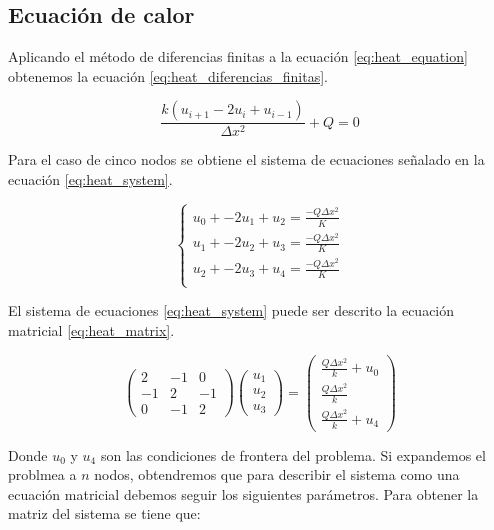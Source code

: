 \subsection{Ecuación de calor}

Aplicando el método de diferencias finitas a la ecuación \ref{eq:heat_equation} obtenemos la ecuación \ref{eq:heat_diferencias_finitas}.

\begin{equation}
    \frac{k(u_{i+1}-2u_i+u_{i-1})}{\Delta x^2} + Q = 0 \label{eq:heat_diferencias_finitas}
\end{equation}

Para el caso de cinco nodos se obtiene el sistema de ecuaciones señalado en la ecuación \ref{eq:heat_system}.

\begin{equation}
    \begin{cases}
        u_0 + -2u_1 +u_2 = \frac{-Q\Delta x^2}{K} \\
        u_1 + -2u_2 +u_3 = \frac{-Q\Delta x^2}{K} \\
        u_2 + -2u_3 +u_4 = \frac{-Q\Delta x^2}{K} \\
    \end{cases} \label{eq:heat_system}
\end{equation}

El sistema de ecuaciones \ref{eq:heat_system} puede ser descrito la ecuación matricial \ref{eq:heat_matrix}.

\begin{equation}
    \begin{pmatrix}
        2  & -1 & 0  \\
        -1 & 2  & -1 \\
        0  & -1 & 2
    \end{pmatrix}
    \begin{pmatrix}
        u_1 \\
        u_2 \\
        u_3
    \end{pmatrix}
    =\begin{pmatrix}
        \frac{Q\Delta x^2}{k}+u_0 \\
        \frac{Q\Delta x^2}{k}     \\
        \frac{Q\Delta x^2}{k} + u_4
    \end{pmatrix}
    \label{eq:heat_matrix}
\end{equation}

Donde $u_0$ y $u_4$ son las condiciones de frontera del problema. Si expandemos el problmea a $n$ nodos, obtendremos que para describir el sistema como una ecuación matricial debemos seguir los siguientes parámetros. Para obtener la matriz del sistema se tiene que:

